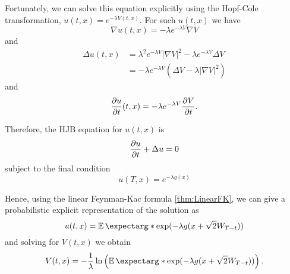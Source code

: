 Fortunately, we can solve this equation explicitly using the Hopf-Cole transformation, $u(t,x)=e^{-\lambda V(t,x)}$. For such $u(t,x)$ we have
\begin{equation}
	\nabla u(t,x)=-\lambda e^{-\lambda V}\nabla V
\end{equation}
and
\begin{equation}
	\begin{split}
		\Delta u(t,x)&=\lambda^2 e^{-\lambda V}|\nabla V|^2-\lambda e^{-\lambda V}\Delta V \\
		&=-\lambda e^{-\lambda V}\left(\Delta V - \lambda |\nabla V|^2 \right)
	\end{split}
\end{equation}
and 
\begin{equation}
	\frac{\partial u}{\partial t}(t,x)=-\lambda e^{-\lambda V} \frac{\partial V}{\partial t}.
\end{equation}

Therefore, the HJB equation for $u(t,x)$ is 
\begin{equation}
	\frac{\partial u}{\partial t}+\Delta u=0
\end{equation}
subject to the final condition 
\begin{equation}
	u(T,x)=e^{-\lambda g(x)}
\end{equation}

Hence, using the linear Feynman-Kac formula \ref{thm:LinearFK}, we can give a probabilistic explicit representation of the solution as
\begin{equation}
	u(t,x)=\expect*{\exp(-\lambda g(x+\sqrt{2}W_{T-t}))}
\end{equation}
and solving for $V(t,x)$ we obtain
\begin{equation}
	V(t,x)=-\frac{1}{\lambda}\ln\left(\expect*{\exp(-\lambda g(x+\sqrt{2}W_{T-t}))}\right).
\end{equation}